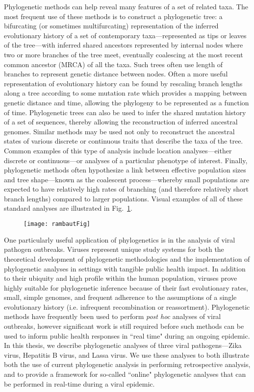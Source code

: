 Phylogenetic methods can help reveal many features of a set of related taxa.
The most frequent use of these methods is to construct a phylogenetic tree: a bifurcating (or sometimes multifurcating) representation of the inferred evolutionary history of a set of contemporary taxa---represented as tips or leaves of the tree---with inferred shared ancestors represented by internal nodes where two or more branches of the tree meet, eventually coalescing at the most recent common ancestor (MRCA) of all the taxa.
Such trees often use length of branches to represent genetic distance between nodes.
Often a more useful representation of evolutionary history can be found by rescaling branch lengths along a tree according to some mutation rate which provides a mapping between genetic distance and time, allowing the phylogeny to be represented as a function of time.
Phylogenetic trees can also be used to infer the shared mutation history of a set of sequences, thereby allowing the reconstruction of inferred ancestral genomes.
Similar methods may be used not only to reconstruct the ancestral states of various discrete or continuous traits that describe the taxa of the tree.
Common examples of this type of analysis include location analyses---either discrete or continuous---or analyses of a particular phenotype of interest.
Finally, phylogenetic methods often hypothesize a link between effective population sizes and tree shape---known as the coalescent process---whereby small populations are expected to have relatively high rates of branching (and therefore relatively short branch lengths) compared to larger populations.
Visual examples of all of these standard analyses are illustrated in Fig.~\ref{fig:phylogeneticsOverview}.

\begin{figure}[ht]
  \centering
  \medskip
  \texttt{[image: rambautFig]}
  \caption[]{}
  \label{fig:phylogeneticsOverview}
\end{figure}

One particularly useful application of phylogenetics is in the analysis of viral pathogen outbreaks.
Viruses represent unique study systems for both the theoretical development of phylogenetic methodologies and the implementation of phylogenetic analyses in settings with tangible public health impact.
In addition to their ubiquity and high profile within the human population, viruses prove highly suitable for phylogenetic inference because of their fast evolutionary rates, small, simple genomes, and frequent adherence to the assumptions of a single evolutionary history (i.e. infrequent recombination or reassortment).
Phylogenetic methods have frequently been used to perform \textit{post hoc} analyses of viral outbreaks, however significant work is still required before such methods can be used to inform public health responses in ``real time" during an ongoing epidemic.
In this thesis, we describe phylogenetic analyses of three viral pathogens---Zika virus, Hepatitis B virus, and Lassa virus.
We use these analyses to both illustrate both the use of current phylogenetic analysis in performing retrospective analysis, and to provide a framework for so-called ``online" phylogenetic analyses that can be performed in real-time during a viral epidemic.

